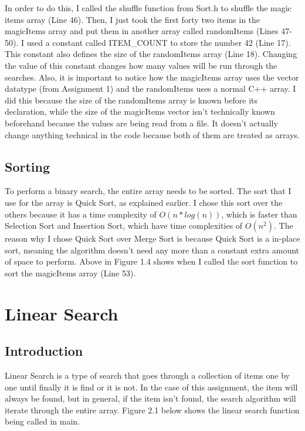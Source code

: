 \documentclass[letterpaper, 10pt]{article}
\begin{document}
\noindent
In order to do this, I called the shuffle function from Sort.h to shuffle the magic items array (Line 46). Then, I just took the first forty two items in the magicItems array and put them in another array called randomItems (Lines 47-50). I used a constant called ITEM\_COUNT to store the number 42 (Line 17). This constant also defines the size of the randomItems array (Line 18). Changing the value of this constant changes how many values will be run through the searches. Also, it is important to notice how the magicItems array uses the vector datatype (from Assignment 1) and the randomItems uses a normal C++ array. I did this because the size of the randomItems array is known before its declaration, while the size of the magicItems vector isn't technically known beforehand because the values are being read from a file. It doesn't actually change anything technical in the code because both of them are treated as arrays.

\subsection{Sorting}
\noindent
To perform a binary search, the entire array needs to be sorted. The sort that I use for the array is Quick Sort, as explained earlier. I chose this sort over the others because it has a time complexity of $O(n * log(n))$, which is faster than Selection Sort and Insertion Sort, which have time complexities of $O(n^2)$. The reason why I chose Quick Sort over Merge Sort is because Quick Sort is a in-place sort, meaning the algorithm doesn't need any more than a constant extra amount of space to perform. Above in Figure 1.4 shows when I called the sort function to sort the magicItems array (Line 53). 

\section{Linear Search}
\setcounter{figure}{0} %

\subsection{Introduction}
\noindent
Linear Search is a type of search that goes through a collection of items one by one until finally it is find or it is not. In the case of this assignment, the item will always be found, but in general, if the item isn't found, the search algorithm will iterate through the entire array. Figure 2.1 below shows the linear search function being called in main.
\end{document}
